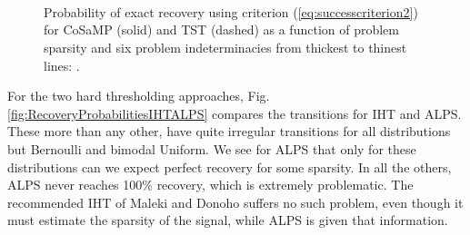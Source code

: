 \documentclass[11pt,draftcls,onecolumn]{IEEEtran}
\begin{document}
\begin{figure}[htb]
\centering
{}\hspace{-0.1in}
\\ \vspace{-0.1in}

\hspace{-0.1in}
\\ \vspace{-0.1in}

\hspace{-0.1in}
\\ \vspace{-0.1in}

\caption{Probability of exact recovery using criterion (\ref{eq:successcriterion2}) 
for CoSaMP (solid) and TST (dashed) as a function of problem sparsity
and six problem indeterminacies from thickest to thinest lines: 
.}
\label{fig:RecoveryProbabilitiesCoSaMPTST}
\end{figure}

For the two hard thresholding approaches,
Fig. \ref{fig:RecoveryProbabilitiesIHTALPS}
compares the transitions for IHT and ALPS.
These more than any other, have quite irregular
transitions for all distributions but Bernoulli and bimodal Uniform.
We see for ALPS that only for these distributions
can we expect perfect recovery for some sparsity.
In all the others, ALPS never reaches 100\% recovery,
which is extremely problematic.
The recommended IHT of Maleki and Donoho \cite{Maleki2010}
suffers no such problem, even though
it must estimate the sparsity of the signal,
while ALPS is given that information.
\end{document}
